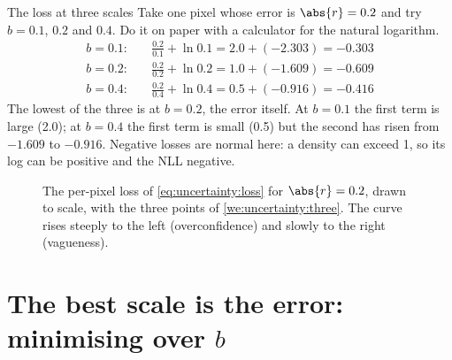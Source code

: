 \begin{worked}[label={we:uncertainty:three}]{The loss at three scales}
Take one pixel whose error is $\abs{r}=0.2$ and try $b=0.1$, $0.2$ and $0.4$. Do it on paper with a
calculator for the natural logarithm.
\begin{align*}
b=0.1:&\quad \frac{0.2}{0.1}+\ln 0.1 = 2.0 + (-2.303) = -0.303\\
b=0.2:&\quad \frac{0.2}{0.2}+\ln 0.2 = 1.0 + (-1.609) = -0.609\\
b=0.4:&\quad \frac{0.2}{0.4}+\ln 0.4 = 0.5 + (-0.916) = -0.416
\end{align*}
The lowest of the three is at $b=0.2$, the error itself. At $b=0.1$ the first term is large (2.0); at
$b=0.4$ the first term is small (0.5) but the second has risen from $-1.609$ to $-0.916$. Negative losses are normal here: a density can exceed 1, so its log can be positive and the NLL negative.
\end{worked}

\begin{figure}[htbp]
\centering
{}
\caption{The per-pixel loss of \cref{eq:uncertainty:loss} for $\abs{r}=0.2$, drawn to scale, with the three
points of \cref{we:uncertainty:three}. The curve rises steeply to the left (overconfidence) and slowly to the
right (vagueness).}
\label{fig:uncertainty:losscurve}
\end{figure}

\section{The best scale is the error: minimising over \texorpdfstring{$b$}{b}}\label{sec:uncertainty:min}

